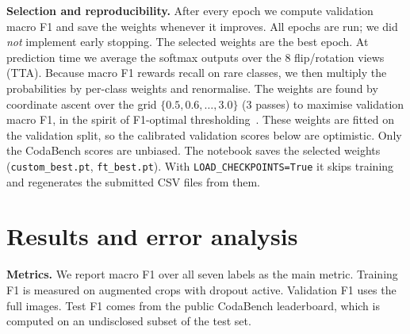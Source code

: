 \documentclass[10pt]{article}
\begin{document}
\textbf{Selection and reproducibility.} After every epoch we compute validation macro F1 and save the weights whenever it improves. All epochs are run; we did \emph{not} implement early stopping. The selected weights are the best epoch. At prediction time we average the softmax outputs over the 8 flip/rotation views (TTA). Because macro F1 rewards recall on rare classes, we then multiply the probabilities by per-class weights and renormalise. The weights are found by coordinate ascent over the grid $\{0.5, 0.6, \dots, 3.0\}$ (3 passes) to maximise validation macro F1, in the spirit of F1-optimal thresholding~\cite{lipton2014f1}. These weights are fitted on the validation split, so the calibrated validation scores below are optimistic. Only the CodaBench scores are unbiased. The notebook saves the selected weights (\texttt{custom\_best.pt}, \texttt{ft\_best.pt}). With \texttt{LOAD\_CHECKPOINTS=True} it skips training and regenerates the submitted CSV files from them.

\section{Results and error analysis}

\textbf{Metrics.} We report macro F1 over all seven labels as the main metric. Training F1 is measured on augmented crops with dropout active. Validation F1 uses the full images. Test F1 comes from the public CodaBench leaderboard, which is computed on an undisclosed subset of the test set.
\end{document}
